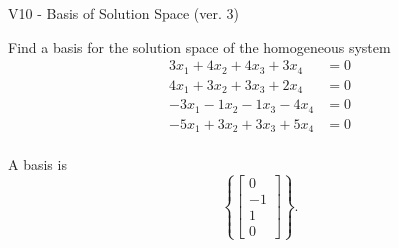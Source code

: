 \begin{exercise}
  \begin{exerciseTitle}V10 - Basis of Solution Space (ver. 3)\end{exerciseTitle}
  \begin{exerciseStatement}
    Find a basis for the solution space of the homogeneous system 
\begin{align*}
 3 x_ 1 + 4 x_ 2 + 4 x_ 3 + 3 x_ 4 &= 0  \\ 
  4 x_ 1 + 3 x_ 2 + 3 x_ 3 + 2 x_ 4 &= 0  \\ 
  -3 x_ 1 -1 x_ 2 -1 x_ 3 -4 x_ 4 &= 0  \\ 
  -5 x_ 1 + 3 x_ 2 + 3 x_ 3 + 5 x_ 4 &= 0  \\ 
 \end{align*}


 
  \end{exerciseStatement}

  \begin{exerciseAnswer}
   A basis is   
\[\left\{\left[\begin{array}{c}
0 \\
-1 \\
1 \\
0
\end{array}\right]\right\}.\]

  


  \end{exerciseAnswer}
\end{exercise}